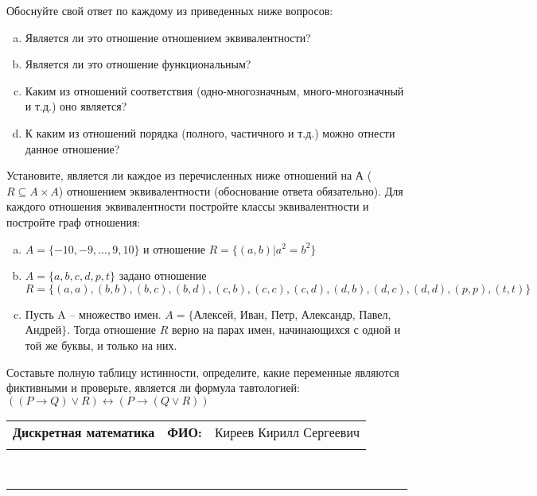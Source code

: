 \documentclass[10pt]{exam}
\newcommand{\class}{Дискретная математика}
\newcommand{\examdate}{}
\begin{document}
\begin{questions}
Обоснуйте свой ответ по каждому из приведенных ниже вопросов:
\begin{enumerate} [a)]\setcounter{enumi}{0}
    \item Является ли это отношение отношением эквивалентности?
    \item Является ли это отношение функциональным?
    \item Каким из отношений соответствия (одно-многозначным, много-многозначный и т.д.) оно является?
    \item К каким из отношений порядка (полного, частичного и т.д.) можно отнести данное отношение?
\end{enumerate}
\question
Установите, является ли каждое из перечисленных ниже отношений на А ($R \subseteq A \times A$) отношением эквивалентности (обоснование ответа обязательно). Для каждого отношения эквивалентности постройте классы 
эквивалентности и постройте граф отношения:
\begin{enumerate} [a)]\setcounter{enumi}{0}
\item $A = \{-10, -9, … , 9, 10\}$ и отношение $R = \{(a,b)|a^{2} = b^{2}\}$
\item $A = \{a, b, c, d, p, t\}$ задано отношение $R = \{(a, a), (b, b), (b, c), (b, d), (c, b), (c, c), (c, d), (d, b), (d, c), (d, d), (p,p), (t,t)\}$
\item Пусть A – множество имен. $A = \{ $Алексей, Иван, Петр, Александр, Павел, Андрей$ \}$. Тогда отношение $R$ верно на парах имен, начинающихся с одной и той же буквы, и только на них.
\end{enumerate}\question Составьте полную таблицу истинности, определите, какие переменные являются фиктивными и проверьте, является ли формула тавтологией:
$((P \rightarrow Q) \lor R) \leftrightarrow (P \rightarrow (Q \lor R))$

\end{questions}
\newpage
\begin{flushright}
\begin{tabular}{p{2.8in} r l}
\textbf{\class} & \textbf{ФИО:} &Киреев Кирилл Сергеевич
\\

\textbf{\examdate} &&\\
\end{tabular}\\
\end{flushright}
\rule[1ex]{\textwidth}{.1pt}
\end{document}
